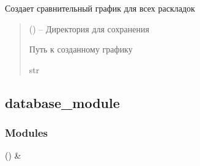 \documentclass[a4paper,11pt,russian,openany,oneside]{sphinxmanual}
\begin{document}
\begin{savenotes}\begin{fulllineitems}
\label{\detokenize{_autosummary/data_module.make_export_plot:data_module.make_export_plot.create_layouts_comparison_chart}}
\pysigstartsignatures
\pysiglinewithargsret
{}
{}
{}
\pysigstopsignatures
\sphinxAtStartPar
Создает сравнительный график для всех раскладок
\begin{quote}\begin{description}
\sphinxAtStartPar
{} () – Директория для сохранения

\sphinxAtStartPar
Путь к созданному графику

\sphinxAtStartPar
str

\end{description}\end{quote}

\end{fulllineitems}\end{savenotes}


\sphinxstepscope


\subsection{database\_module}
\label{\detokenize{_autosummary/database_module:module-database_module}}\label{\detokenize{_autosummary/database_module:database-module}}\label{\detokenize{_autosummary/database_module::doc}}\subsubsection*{Modules}


\begin{savenotes}\sphinxattablestart
\sphinxthistablewithglobalstyle
\sphinxthistablewithnovlinesstyle
\centering
\begin{tabulary}{\linewidth}[t]{}
\sphinxtoprule
\sphinxtableatstartofbodyhook
\sphinxAtStartPar
{\hyperref[\detokenize{database_module:module-database_module.database}]{}} ()
&
\sphinxAtStartPar

\\
\sphinxbottomrule
\end{tabulary}
\sphinxtableafterendhook\par
\sphinxattableend\end{savenotes}
\end{document}

